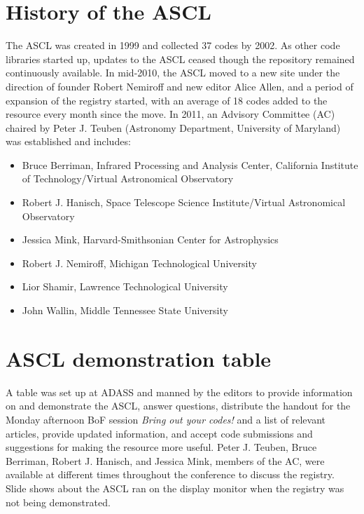 \section{History of the ASCL}

The ASCL was created in 1999 and collected 37 codes by 2002. As other code libraries started up, updates to the ASCL ceased though the repository remained continuously available. In mid-2010, the ASCL moved to a new site under the direction of founder Robert Nemiroff and new editor Alice Allen, and a period of expansion of the registry started, with an average of 18 codes added to the resource every month since the move. In 2011, an Advisory Committee (AC) chaired by Peter J. Teuben (Astronomy Department, University of Maryland) was established and includes: 
\begin{itemize}
\item Bruce Berriman, Infrared Processing and Analysis Center, California Institute of Technology/Virtual Astronomical Observatory
\item Robert J. Hanisch, Space Telescope Science Institute/Virtual Astronomical Observatory
\item Jessica Mink, Harvard-Smithsonian Center for Astrophysics
\item Robert J. Nemiroff, Michigan Technological University
\item Lior Shamir, Lawrence Technological University
\item John Wallin, Middle Tennessee State University
\end{itemize}

\section{ASCL demonstration table}

A table was set up at ADASS and manned by the editors to provide information on and demonstrate the ASCL, answer questions, distribute the handout for the Monday afternoon BoF session {\em Bring out your codes!} and a list of relevant articles, provide updated information, and accept code submissions and suggestions for making the resource more useful. Peter J. Teuben,  Bruce Berriman, Robert J. Hanisch, and Jessica Mink, members of the AC, were available at different times throughout the conference to discuss the registry. Slide shows about the ASCL ran on the display monitor when the registry was not being demonstrated.

